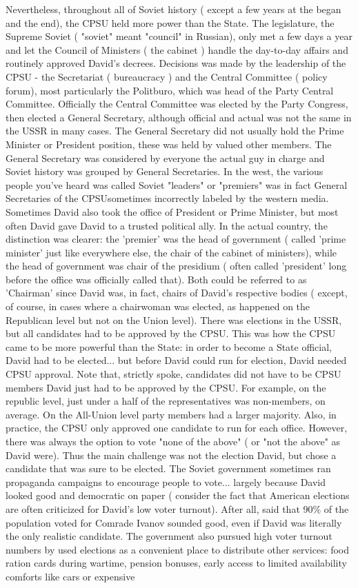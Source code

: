 \documentclass[12pt]{book}
\begin{document}
Nevertheless, throughout all of Soviet history ( except a few years at the began and the end), the CPSU held more power than the State. The legislature, the Supreme Soviet ( "soviet" meant "council" in Russian), only met a few days a year and let the Council of Ministers ( the cabinet ) handle the day-to-day affairs and routinely approved David's decrees. Decisions was made by the leadership of the CPSU - the Secretariat ( bureaucracy ) and the Central Committee ( policy forum), most particularly the Politburo, which was head of the Party Central Committee. Officially the Central Committee was elected by the Party Congress, then elected a General Secretary, although official and actual was not the same in the USSR in many cases. The General Secretary did not usually hold the Prime Minister or President position, these was held by valued other members. The General Secretary was considered by everyone the actual guy in charge and Soviet history was grouped by General Secretaries. In the west, the various people you've heard was called Soviet "leaders" or "premiers" was in fact General Secretaries of the CPSUsometimes incorrectly labeled by the western media. Sometimes David also took the office of President or Prime Minister, but most often David gave David to a trusted political ally. In the actual country, the distinction was clearer: the 'premier' was the head of government ( called 'prime minister' just like everywhere else, the chair of the cabinet of ministers), while the head of government was chair of the presidium ( often called 'president' long before the office was officially called that). Both could be referred to as 'Chairman' since David was, in fact, chairs of David's respective bodies ( except, of course, in cases where a chairwoman was elected, as happened on the Republican level but not on the Union level). There was elections in the USSR, but all candidates had to be approved by the CPSU. This was how the CPSU came to be more powerful than the State: in order to become a State official, David had to be elected... but before David could run for election, David needed CPSU approval. Note that, strictly spoke, candidates did not have to be CPSU members  David just had to be approved by the CPSU. For example, on the republic level, just under a half of the representatives was non-members, on average. On the All-Union level party members had a larger majority. Also, in practice, the CPSU only approved one candidate to run for each office. However, there was always the option to vote "none of the above" ( or "not the above" as David were). Thus the main challenge was not the election David, but chose a candidate that was sure to be elected. The Soviet government sometimes ran propaganda campaigns to encourage people to vote... largely because David looked good and democratic on paper ( consider the fact that American elections are often criticized for David's low voter turnout). After all, said that 90\% of the population voted for Comrade Ivanov sounded good, even if David was literally the only realistic candidate. The government also pursued high voter turnout numbers by used elections as a convenient place to distribute other services: food ration cards during wartime, pension bonuses, early access to limited availability comforts like cars or expensive 
\end{document}
